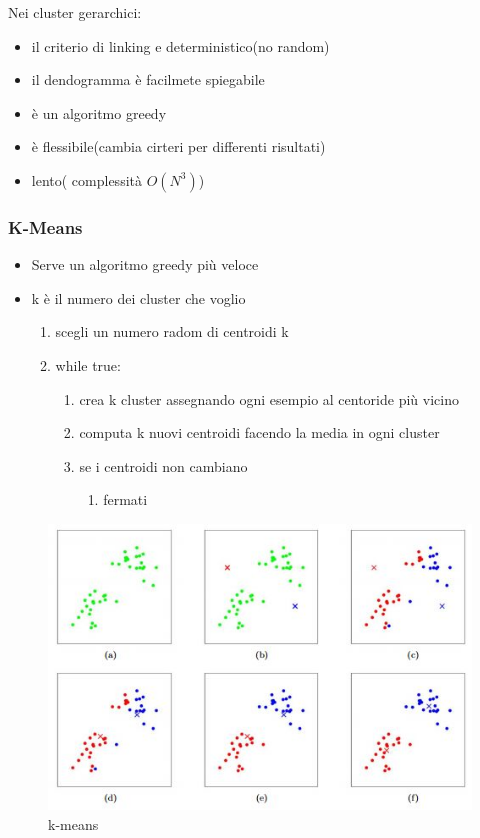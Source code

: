 Nei cluster gerarchici:
\begin{itemize}
    \item il criterio di linking e deterministico(no random)
    \item il dendogramma è facilmete spiegabile
    \item è un algoritmo greedy
    \item è flessibile(cambia cirteri per differenti risultati)
    \item lento( complessità $O(N^3)$)
\end{itemize}


\subsubsection{K-Means}
\begin{itemize}
    \item Serve un algoritmo greedy più veloce
    \item k è il numero dei cluster che voglio
    \begin{enumerate}
        \item scegli un numero radom di centroidi k
        \item while true:
        \begin{enumerate}
            \item crea k cluster assegnando ogni esempio al centoride più vicino
            \item computa k nuovi centroidi facendo la media in ogni cluster
            \item se i centroidi non cambiano
            \begin{enumerate}
                \item fermati
            \end{enumerate}
        \end{enumerate}
    \end{enumerate}
\end{itemize}
\begin{figure}[H]
    \centering
    \includegraphics[width=0.8\linewidth]{imgs/k-means}
    \caption{k-means}
    \label{fig:k-means}
\end{figure}


